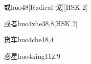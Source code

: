 \begin{entry}{或}{huo4}{8}[Radical 戈][HSK 2]
\end{entry}

\begin{entry}{或者}{huo4zhe3}{8,8}[HSK 2]
\end{entry}

\begin{entry}{货车}{huo4che1}{8,4}
\end{entry}

\begin{entry}{惑星}{huo4xing1}{12,9}
\end{entry}


